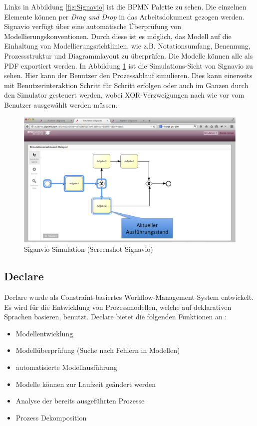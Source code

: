 Links in Abbildung \ref{fig:Signavio} ist die BPMN Palette zu sehen. Die einzelnen Elemente können per \textit{Drag and Drop} in das Arbeitsdokument gezogen werden. Signavio verfügt über eine automatische Überprüfung von Modellierungskonventionen. Durch diese ist es möglich, das Modell auf die Einhaltung von Modellierungsrichtlinien, wie z.B. Notationsumfang, Benennung, Prozessstruktur und Diagrammlayout zu überprüfen. Die Modelle können alle als PDF exportiert werden. \newline
In Abbildung \ref{fig:Simulation} ist die Simulations-Sicht von Signavio zu sehen. Hier kann der Benutzer den Prozessablauf simulieren. Dies kann einerseits mit Benutzerinteraktion Schritt für Schritt erfolgen oder auch im Ganzen durch den Simulator gesteuert werden, wobei XOR-Verzweigungen nach wie vor vom Benutzer ausgewählt werden müssen.
\begin{figure}[H]
\begin{center}
  \includegraphics[scale=0.6]{Simulation} %
  \caption{Siganvio Simulation (Screenshot Signavio)}
  \label{fig:Simulation}
\end{center}
\end{figure} 



\subsection{Declare}

Declare wurde als Constraint-basiertes Workflow-Management-System entwickelt. Es wird für die Entwicklung von Prozessmodellen, welche auf deklarativen Sprachen basieren, benutzt. Declare bietet die folgenden Funktionen an \cite{pesic2007declare}:
\begin {itemize}
\item Modellentwicklung
\item Modellüberprüfung (Suche nach Fehlern in Modellen)
\item automatisierte Modellausführung
\item Modelle können zur Laufzeit geändert werden
\item Analyse der bereits ausgeführten Prozesse
\item Prozess Dekomposition
\end {itemize}

